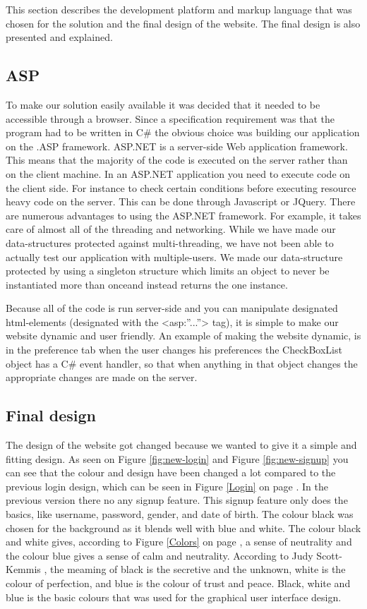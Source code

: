 This section describes the development platform and markup language that was chosen for the solution and the final design of the website. The final design is also presented and explained.

\subsection{ASP}
To make our solution easily available it was decided that it needed to be accessible through a browser. Since a specification requirement was that the program had to be written in C\# the obvious choice was building our application on the .ASP framework. ASP.NET is a server-side Web application framework. This means that the majority of the code is executed on the server rather than on the client machine. In an ASP.NET application you need to execute code on the client side. For instance to check certain conditions before executing resource heavy code on the server. This can be done through Javascript or JQuery. There are numerous advantages to using the ASP.NET framework. For example, it takes care of almost all of the threading and networking. While we have made our data-structures protected against multi-threading, we have not been able to actually test our application with multiple-users. We made our data-structure protected by using a singleton structure which limits an object to never be instantiated more than onceand instead returns the one instance.

Because all of the code is run server-side and you can manipulate designated html-elements  (designated with the <asp:”...”> tag), it is simple to make our website dynamic and user friendly. An example of making the website dynamic, is in the preference tab when the user changes his preferences the CheckBoxList object has a C\# event handler, so that when anything in that object changes the appropriate changes are made on the server.

\subsection{Final design}
The design of the website got changed because we wanted to give it a simple and fitting design. As seen on Figure \ref{fig:new-login} and Figure \ref{fig:new-signup} you can see that the colour and design have been changed a lot compared to the previous login design, which can be seen in Figure \ref{Login} on page \pageref{Login}. In the previous version there no any signup feature. This signup feature only does the basics, like username, password, gender, and date of birth. The colour black was chosen for the background as it blends well with blue and white. The colour black and white gives, according to Figure \ref{Colors} on page \pageref{Colors}, a sense of neutrality and the colour blue gives a sense of calm and neutrality. According to Judy Scott-Kemmis \cite{EmpowerColor}, the meaming of black is the secretive and the unknown, white is the colour of perfection, and blue is the colour of trust and peace. Black, white and blue is the basic colours that was used for the graphical user interface design.



